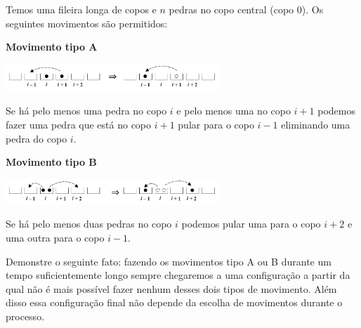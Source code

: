 Temos uma fileira longa de copos e $n$ pedras no copo central (copo $0$).
Os seguintes movimentos são permitidos:

\textbf{Movimento tipo A}

\includegraphics[width = 0.6\textwidth]{figuraA.png}

Se há pelo menos uma pedra no copo $i$ e pelo menos uma no copo $i + 1$ podemos fazer uma pedra que está no copo $i + 1$ pular para o copo $i - 1$ eliminando uma pedra do copo $i$.

\textbf{Movimento tipo B}

\includegraphics[width = 0.6\textwidth]{figuraB.png}

Se há pelo menos duas pedras no copo $i$ podemos pular uma para o copo $i + 2$ e uma outra para o copo $i - 1$.

Demonstre o seguinte fato: fazendo os movimentos tipo A ou B durante um tempo suficientemente longo sempre chegaremos a uma configuração a partir da qual não é mais possível fazer nenhum desses dois tipos de movimento.
Além disso essa configuração final não depende da escolha de movimentos durante o processo.